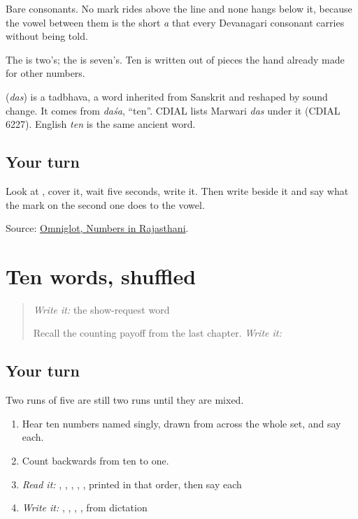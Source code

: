 Bare consonants. No mark rides above the line and none hangs below it, because the vowel between them is the short \emph{a} that every Devanagari consonant carries without being told.

The \textbf{} is two's; the \textbf{} is seven's. Ten is written out of pieces the hand already made for other numbers.

\begin{cousinweb}
\textbf{} (\emph{das}) is a tadbhava, a word inherited from Sanskrit and reshaped by sound change. It comes from \emph{daśa}, \textquotedblleft{}ten\textquotedblright{}. CDIAL lists Marwari \emph{das} under it (CDIAL 6227). English \emph{ten} is the same ancient word.
\end{cousinweb}

\subsection*{Your turn}
Look at \textbf{}, cover it, wait five seconds, write it. Then write \textbf{} beside it and say what the mark on the second one does to the vowel.

\begin{tcolorbox}[breakable,colback=teal!4,colframe=teal!35!black,title={Before you move on}]
Source: \href{https://www.omniglot.com/language/numbers/rajasthani.htm}{Omniglot, Numbers in Rajasthani}.
\end{tcolorbox}
\section[Practice]{Ten words, shuffled}

\label{lesson:MW-R33-count-recall}



\begin{quote}
\emph{Write it:} the show-request word

Recall the counting payoff from the last chapter. \emph{Write it:} \textbf{}
\end{quote}

\subsection*{Your turn}
Two runs of five are still two runs until they are mixed.

\begin{enumerate}
\raggedright
  \item Hear ten numbers named singly, drawn from across the whole set, and say each.
  \item Count backwards from ten to one.
  \item \emph{Read it:} \textbf{}, \textbf{}, \textbf{}, \textbf{}, \textbf{}, \textbf{} printed in that order, then say each
  \item \emph{Write it:} \textbf{}, \textbf{}, \textbf{}, \textbf{}, \textbf{} from dictation
\end{enumerate}

